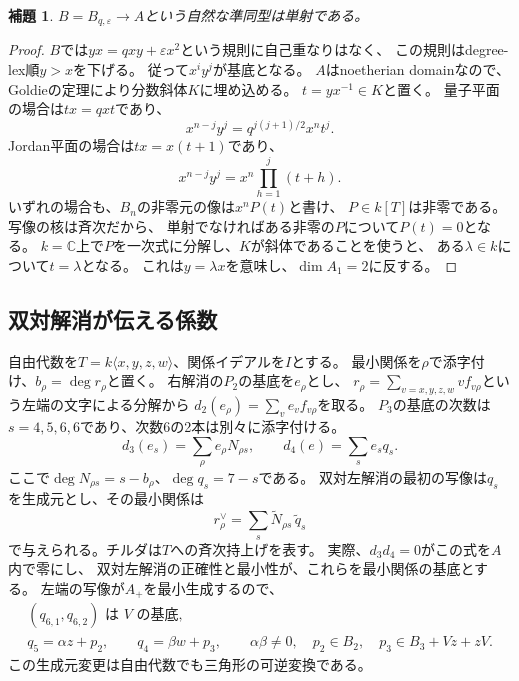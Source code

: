\documentclass[11pt,a4paper]{ltjsarticle}
\newtheorem{lemma}[theorem]{補題}
\theoremstyle{definition}
\begin{document}
\begin{lemma}\label{spec:lem:plane-embedding}
$B=B_{q,\varepsilon}\to A$という自然な準同型は単射である。
\end{lemma}
\begin{proof}
$B$では$yx=qxy+\varepsilon x^2$という規則に自己重なりはなく、
この規則はdegree-lex順$y>x$を下げる。
従って$x^iy^j$が基底となる。
$A$はnoetherian domainなので、Goldieの定理により分数斜体$K$に埋め込める。
$t=yx^{-1}\in K$と置く。
量子平面の場合は$tx=qxt$であり、
\[
x^{n-j}y^j=q^{j(j+1)/2}x^n t^j.
\]
Jordan平面の場合は$tx=x(t+1)$であり、
\[
x^{n-j}y^j=x^n\prod_{h=1}^{j}(t+h).
\]
いずれの場合も、$B_n$の非零元の像は$x^nP(t)$と書け、
$P\in k[T]$は非零である。写像の核は斉次だから、
単射でなければある非零の$P$について$P(t)=0$となる。
$k=\mathbb C$上で$P$を一次式に分解し、$K$が斜体であることを使うと、
ある$\lambda\in k$について$t=\lambda$となる。
これは$y=\lambda x$を意味し、$\dim A_1=2$に反する。
\end{proof}

\subsection{双対解消が伝える係数}\label{spec:subsec:dual-coefficient}
自由代数を$T=k\langle x,y,z,w\rangle$、関係イデアルを$I$とする。
最小関係を$\rho$で添字付け、$b_\rho=\deg r_\rho$と置く。
右解消の$P_2$の基底を$e_\rho$とし、
$r_\rho=\sum_{v=x,y,z,w}v f_{v\rho}$という左端の文字による分解から
$d_2(e_\rho)=\sum_v e_v f_{v\rho}$を取る。
$P_3$の基底の次数は$s=4,5,6,6$であり、次数6の2本は別々に添字付ける。
\[
d_3(e_s)=\sum_\rho e_\rho N_{\rho s},\qquad
d_4(e)=\sum_s e_s q_s.
\]
ここで$\deg N_{\rho s}=s-b_\rho$、$\deg q_s=7-s$である。
双対左解消の最初の写像は$q_s$を生成元とし、その最小関係は
\begin{equation}\label{spec:eq:dual-relations}
r^\vee_\rho=\sum_s \widetilde N_{\rho s}\,\widetilde q_s
\end{equation}
で与えられる。チルダは$T$への斉次持上げを表す。
実際、$d_3d_4=0$がこの式を$A$内で零にし、
双対左解消の正確性と最小性が、これらを最小関係の基底とする。
左端の写像が$A_+$を最小生成するので、
\begin{equation}\label{spec:eq:dual-generators}
\begin{gathered}
(q_{6,1},q_{6,2})\text{ は }V\text{ の基底},\\
q_5=\alpha z+p_2,\qquad q_4=\beta w+p_3,\qquad
\alpha\beta\ne0,\quad
p_2\in B_2,\quad p_3\in B_3+Vz+zV.
\end{gathered}
\end{equation}
この生成元変更は自由代数でも三角形の可逆変換である。
\end{document}
